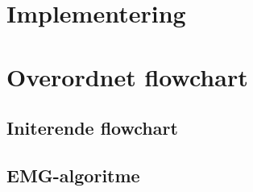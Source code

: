 \section{Implementering}


\section{Overordnet flowchart}


\subsection{Initerende flowchart}


\subsection{EMG-algoritme}